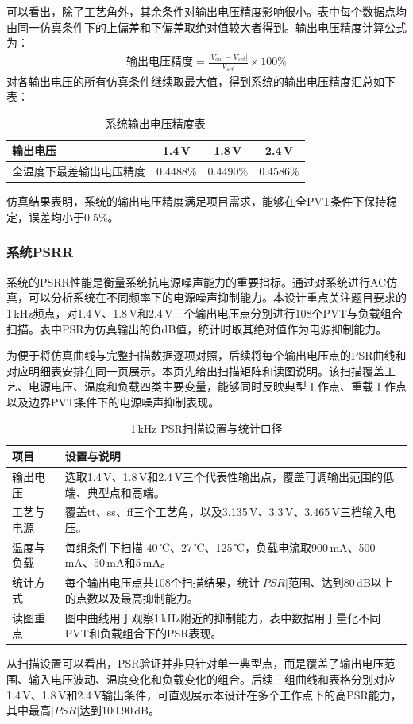 \documentclass[a4paper, 12pt]{article}
\begin{document}
可以看出，除了工艺角外，其余条件对输出电压精度影响很小。表中每个数据点均由同一仿真条件下的上偏差和下偏差取绝对值较大者得到。输出电压精度计算公式为：
\begin{gather}
  \text{输出电压精度} = \frac{\left|V_{out} - V_{set}\right|}{V_{set}} \times 100\%
\end{gather}
对各输出电压的所有仿真条件继续取最大值，得到系统的输出电压精度汇总如下表：
\begin{table}[H]
  \centering
  \begin{tabular}{lccc}
    \toprule
    输出电压 & 1.4\,V & 1.8\,V & 2.4\,V \\
    \midrule
    全温度下最差输出电压精度 & 0.4488\% & 0.4490\% & 0.4586\% \\
    \bottomrule
  \end{tabular}
  \caption{系统输出电压精度表}
  \label{tab:output-voltage-accuracy}
\end{table}
仿真结果表明，系统的输出电压精度满足项目需求，能够在全PVT条件下保持稳定，误差均小于0.5\%。

\subsubsection{系统PSRR}

系统的PSRR性能是衡量系统抗电源噪声能力的重要指标。通过对系统进行AC仿真，可以分析系统在不同频率下的电源噪声抑制能力。本设计重点关注题目要求的1\,kHz频点，对1.4\,V、1.8\,V和2.4\,V三个输出电压点分别进行108个PVT与负载组合扫描。表中PSR为仿真输出的负dB值，统计时取其绝对值作为电源抑制能力。

为便于将仿真曲线与完整扫描数据逐项对照，后续将每个输出电压点的PSR曲线和对应明细表安排在同一页展示。本页先给出扫描矩阵和读图说明。该扫描覆盖工艺、电源电压、温度和负载四类主要变量，能够同时反映典型工作点、重载工作点以及边界PVT条件下的电源噪声抑制表现。
\begin{table}[H]
  \centering
  \small
  \setlength{\tabcolsep}{4pt}
  \begin{tabularx}{\textwidth}{lX}
    \toprule
    项目 & 设置与说明 \\
    \midrule
    输出电压 & 选取1.4\,V、1.8\,V和2.4\,V三个代表性输出点，覆盖可调输出范围的低端、典型点和高端。 \\
    工艺与电源 & 覆盖tt、ss、ff三个工艺角，以及3.135\,V、3.3\,V、3.465\,V三档输入电压。 \\
    温度与负载 & 每组条件下扫描-40\,℃、27\,℃、125\,℃，负载电流取900\,mA、500\,mA、50\,mA和5\,mA。 \\
    统计方式 & 每个输出电压点共108个扫描结果，统计$|PSR|$范围、达到80\,dB以上的点数以及最高抑制能力。 \\
    读图重点 & 图中曲线用于观察1\,kHz附近的抑制能力，表中数据用于量化不同PVT和负载组合下的PSR表现。 \\
    \bottomrule
  \end{tabularx}
  \caption{1\,kHz PSR扫描设置与统计口径}
  \label{tab:psr-settings}
\end{table}
从扫描设置可以看出，PSR验证并非只针对单一典型点，而是覆盖了输出电压范围、输入电压波动、温度变化和负载变化的组合。后续三组曲线和表格分别对应1.4\,V、1.8\,V和2.4\,V输出条件，可直观展示本设计在多个工作点下的高PSR能力，其中最高$|PSR|$达到100.90\,dB。
\end{document}
